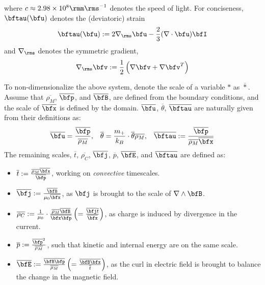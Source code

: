     where $c \approx 2.98\times 10^{8}\rmm\rms^{- 1}$ denotes the speed of light.  For conciseness, $\bftau(\bfu)$ denotes the (deviatoric) strain
    \begin{equation}\label{eqn:strain equation}
        \bftau(\bfu)  :=  2\nabla_{\rms}\bfu - \frac{2}{3}(\nabla\cdot\bfu)\bfI
    \end{equation}
    and $\nabla_{\rms}$ denotes the symmetric gradient,
    \begin{equation}
        \nabla_{\rms}\bfv  :=  \frac{1}{2}\left(\nabla\bfv + \nabla\bfv^{T}\right)
    \end{equation}

    To non-dimensionalize the above system, denote the scale of a variable $*$ as $\overline{*}$. Assume that $\overline{\rho_{M}}$, $\overline{\bfp}$, and $\overline{\bfB}$, are defined from the boundary conditions, and the scale of $\overline{\bfx}$ is defined by the domain. $\overline{\bfu}$, $\overline{\theta}$, $\overline{\bftau}$ are naturally given from their definitions as:
    \begin{align}
        \overline{\bfu}  =  \frac{\overline{\bfp}}{\overline{\rho_{M}}},  &&
        \overline{\theta}  =  \frac{m_{+}}{k_{B}}\cdot{\overline{\theta}\overline{\rho_{M}}},  &&
        \overline{\bftau}  :=  \frac{\overline{\bfp}}{\overline{\rho_{M}}\overline{\bfx}}
    \end{align}
    The remaining scales, $\overline{t}$, $\overline{\rho_{C}}$, $\overline{\bfj}$, $\overline{p}$, $\overline{\bfE}$, and $\overline{\bftau}$ are defined as:  
    \begin{itemize}
        \item  $\overline{t}  :=  \frac{\overline{\rho_{M}}\overline{\bfx}}{\overline{\bfp}}$, working on \emph{convective} timescales.
        \item  $\overline{\bfj}  :=  \frac{\overline{\bfB}}{\mu_{0}\overline{\bfx}}$, as $\bfj$ is brought to the scale of $\nabla\wedge\bfB$.
        \item  $\overline{\rho_{C}}  :=  \frac{1}{\mu_{0}}\cdot\frac{\overline{\rho_{M}}\overline{\bfB}}{\overline{\bfx}\overline{\bfp}}  \left(=  \frac{\overline{\bfj}\overline{t}}{\overline{\bfx}}\right)$, as charge is induced by divergence in the current.
        \item  $\overline{p}  :=  \frac{\overline{\bfp}^{2}}{\overline{\rho_{M}}}$, such that kinetic and internal energy are on the same scale.
        \item  $\overline{\bfE}  :=  \frac{\overline{\bfB}\overline{\bfp}}{\overline{\rho_{M}}}  \left(=  \frac{\overline{\bfB}\overline{\bfx}}{\overline{t}}\right)$, as the curl in electric field is brought to balance the change in the magnetic field.
    \end{itemize}
